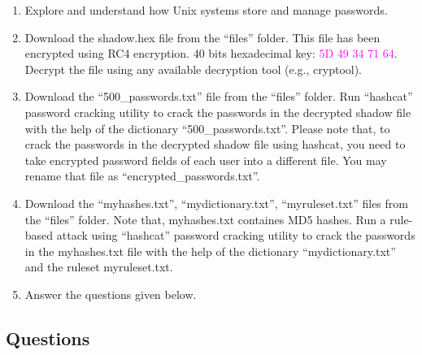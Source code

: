 \documentclass[11pt,letterpaper]{article}
\begin{document}
	\begin{enumerate}
		\item Explore and understand how Unix systems store and manage passwords.
		
		\item Download the shadow.hex file from the ``files'' folder. This file has been encrypted using RC4 encryption. 40 bits hexadecimal key: \textcolor{magenta}{5D 49 34 71 64}. Decrypt the file using any available decryption tool (e.g., cryptool).
		
		\item Download the ``500\_passwords.txt'' file from the “files” folder. Run ``hashcat'' password cracking utility to crack the passwords in the decrypted shadow file with the help of the dictionary ``500\_passwords.txt''. Please note that, to crack the passwords in the decrypted shadow file using hashcat, you need to take encrypted password fields of each user into a different file. You may rename that file as ``encrypted\_passwords.txt''.
		
		\item Download the ``myhashes.txt'', ``mydictionary.txt'', ``myruleset.txt''  files from the “files” folder. Note that, myhashes.txt containes MD5 hashes. Run a rule-based attack using “hashcat” password cracking utility to crack the passwords in the myhashes.txt file with the help of the dictionary “mydictionary.txt” and the ruleset myruleset.txt.
		
		\item Answer the questions given below.
		
	\end{enumerate}
	
	\newpage
	\subsection*{Questions}
	
\end{document}

